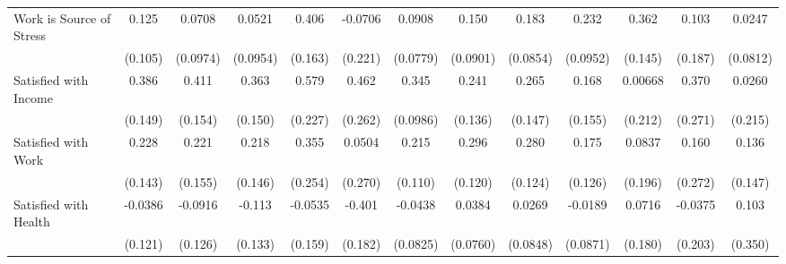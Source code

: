 {\begin{tabular}{l*{12}{c}}
\addlinespace
Work is Source of Stress&       0.125         &      0.0708         &      0.0521         &       0.406\sym{*}  &     -0.0706         &      0.0908         &       0.150         &       0.183\sym{*}  &       0.232\sym{*}  &       0.362\sym{*}  &       0.103         &      0.0247         \\
            &     (0.105)         &    (0.0974)         &    (0.0954)         &     (0.163)         &     (0.221)         &    (0.0779)         &    (0.0901)         &    (0.0854)         &    (0.0952)         &     (0.145)         &     (0.187)         &    (0.0812)         \\
\addlinespace
Satisfied with Income&       0.386\sym{**} &       0.411\sym{**} &       0.363\sym{*}  &       0.579\sym{*}  &       0.462         &       0.345\sym{***}&       0.241         &       0.265         &       0.168         &     0.00668         &       0.370         &      0.0260         \\
            &     (0.149)         &     (0.154)         &     (0.150)         &     (0.227)         &     (0.262)         &    (0.0986)         &     (0.136)         &     (0.147)         &     (0.155)         &     (0.212)         &     (0.271)         &     (0.215)         \\
\addlinespace
Satisfied with Work&       0.228         &       0.221         &       0.218         &       0.355         &      0.0504         &       0.215         &       0.296\sym{*}  &       0.280\sym{*}  &       0.175         &      0.0837         &       0.160         &       0.136         \\
            &     (0.143)         &     (0.155)         &     (0.146)         &     (0.254)         &     (0.270)         &     (0.110)         &     (0.120)         &     (0.124)         &     (0.126)         &     (0.196)         &     (0.272)         &     (0.147)         \\
\addlinespace
Satisfied with Health&     -0.0386         &     -0.0916         &      -0.113         &     -0.0535         &      -0.401\sym{*}  &     -0.0438         &      0.0384         &      0.0269         &     -0.0189         &      0.0716         &     -0.0375         &       0.103         \\
            &     (0.121)         &     (0.126)         &     (0.133)         &     (0.159)         &     (0.182)         &    (0.0825)         &    (0.0760)         &    (0.0848)         &    (0.0871)         &     (0.180)         &     (0.203)         &     (0.350)         \\

\end{tabular}}
